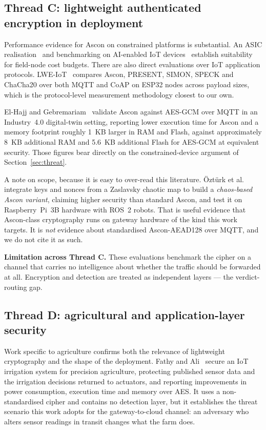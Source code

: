 \documentclass[conference]{IEEEtran}
\begin{document}
\subsection{Thread C: lightweight authenticated encryption in deployment}
Performance evidence for Ascon on constrained platforms is substantial. An ASIC
realisation~\cite{khan2024asconasic} and benchmarking on AI-enabled IoT
devices~\cite{khan2022asconperf} establish suitability for field-node cost budgets. There are
also direct evaluations over IoT application protocols. LWE-IoT~\cite{suleiman2026lweiot} compares
Ascon, PRESENT, SIMON, SPECK and ChaCha20 over both MQTT and CoAP on ESP32 nodes across payload
sizes, which is the protocol-level measurement methodology closest to our own.

El-Hajj and Gebremariam~\cite{elhajj2024asconindustry40} validate Ascon against AES-GCM over MQTT
in an Industry~4.0 digital-twin setting, reporting lower execution time for Ascon and a memory
footprint roughly 1~KB larger in RAM and Flash, against approximately 8~KB additional RAM and
5.6~KB additional Flash for AES-GCM at equivalent security. Those figures bear directly on the
constrained-device argument of Section~\ref{sec:threat}.

A note on scope, because it is easy to over-read this literature. Öztürk et
al.~\cite{ozturk2025chaosascon} integrate keys and nonces from a Zaslavsky chaotic map to build a
\emph{chaos-based Ascon variant}, claiming higher security than standard Ascon, and test it on
Raspberry~Pi~3B hardware with ROS~2 robots. That is useful evidence that Ascon-class
cryptography runs on gateway hardware of the kind this work targets. It is \emph{not} evidence
about standardised Ascon-AEAD128 over MQTT, and we do not cite it as such.

\textbf{Limitation across Thread C.} These evaluations benchmark the cipher on a channel that
carries no intelligence about whether the traffic should be forwarded at all. Encryption and
detection are treated as independent layers --- the verdict-routing gap.

\subsection{Thread D: agricultural and application-layer security}
Work specific to agriculture confirms both the relevance of lightweight cryptography and the
shape of the deployment. Fathy and Ali~\cite{fathy2023irrigation} secure an IoT irrigation system
for precision agriculture, protecting published sensor data and the irrigation decisions returned
to actuators, and reporting improvements in power consumption, execution time and memory over
AES. It uses a non-standardised cipher and contains no detection layer, but it establishes the
threat scenario this work adopts for the gateway-to-cloud channel: an adversary who alters sensor
readings in transit changes what the farm does.
\end{document}
